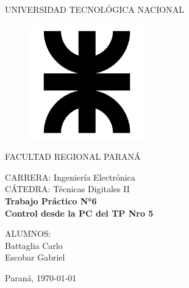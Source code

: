 \documentclass[a4paper, 12pt]{article}
\begin{document}
\begin{titlepage}
	\begin{center}
		{\large{UNIVERSIDAD TECNOLÓGICA NACIONAL}}
	\end{center}
	\vspace{15pt}
	\begin{figure}[!ht]
		\centering
		\begin{center}
			\includegraphics[width=5cm]{utn.png}
		\end{center}
	\end{figure}
	\vspace{5pt}
	\begin{center}
		{\large{FACULTAD REGIONAL PARANÁ}}
		\vspace{5pt}
		\begin{center}
			\vspace{15pt}
			\normalsize{CARRERA: Ingeniería Electrónica\\
						CÁTEDRA: Técnicas Digitales II\\}
			\vspace{50pt}
			\huge\bfseries{Trabajo Práctico N°6\\
				Control desde la PC del TP Nro 5\\}
\vspace{50pt}
		\end{center}
		
		\begin{flushleft}
			\begin{center}
				ALUMNOS:\\
				Battaglia Carlo\\
				Escobar Gabriel\\
			\end{center}
		\end{flushleft}
		
		\begin{center}
			\vspace{\fill}
			\normalsize{Paraná,}
			\today
		\end{center}
	\end{center}
\end{titlepage}
\end{document}
